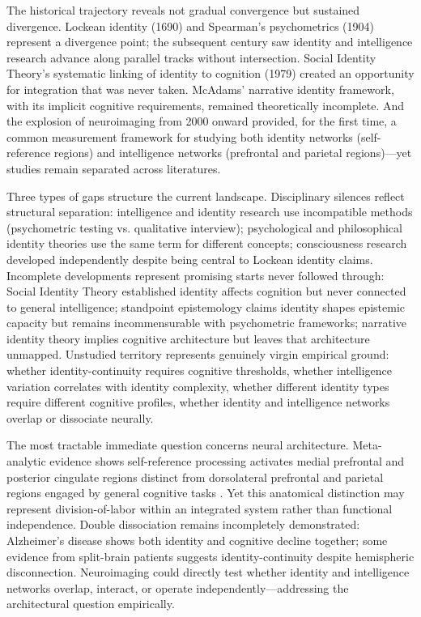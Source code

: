 \documentclass[12pt, a4paper]{article}
\begin{document}
The historical trajectory reveals not gradual convergence but sustained divergence. Lockean identity (1690) and Spearman's psychometrics (1904) represent a divergence point; the subsequent century saw identity and intelligence research advance along parallel tracks without intersection. Social Identity Theory's systematic linking of identity to cognition (1979) created an opportunity for integration that was never taken. McAdams' narrative identity framework, with its implicit cognitive requirements, remained theoretically incomplete. And the explosion of neuroimaging from 2000 onward provided, for the first time, a common measurement framework for studying both identity networks (self-reference regions) and intelligence networks (prefrontal and parietal regions)—yet studies remain separated across literatures.

Three types of gaps structure the current landscape. Disciplinary silences reflect structural separation: intelligence and identity research use incompatible methods (psychometric testing vs. qualitative interview); psychological and philosophical identity theories use the same term for different concepts; consciousness research developed independently despite being central to Lockean identity claims. Incomplete developments represent promising starts never followed through: Social Identity Theory established identity affects cognition but never connected to general intelligence; standpoint epistemology claims identity shapes epistemic capacity but remains incommensurable with psychometric frameworks; narrative identity theory implies cognitive architecture but leaves that architecture unmapped. Unstudied territory represents genuinely virgin empirical ground: whether identity-continuity requires cognitive thresholds, whether intelligence variation correlates with identity complexity, whether different identity types require different cognitive profiles, whether identity and intelligence networks overlap or dissociate neurally.

The most tractable immediate question concerns neural architecture. Meta-analytic evidence shows self-reference processing activates medial prefrontal and posterior cingulate regions distinct from dorsolateral prefrontal and parietal regions engaged by general cognitive tasks \cite{Northoff2006}. Yet this anatomical distinction may represent division-of-labor within an integrated system rather than functional independence. Double dissociation remains incompletely demonstrated: Alzheimer's disease shows both identity and cognitive decline together; some evidence from split-brain patients suggests identity-continuity despite hemispheric disconnection. Neuroimaging could directly test whether identity and intelligence networks overlap, interact, or operate independently—addressing the architectural question empirically.
\end{document}
